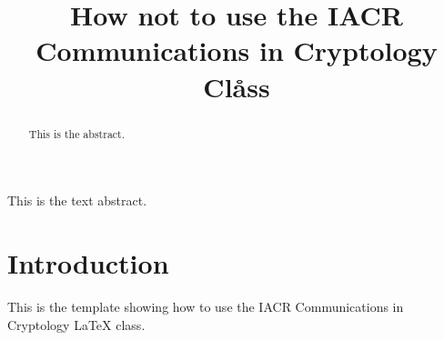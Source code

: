 \documentclass[version=final]{iacrcc}
\title[running  = {The iacrcc class},
       subtitle = {A Template}
      ]{How not to use the IACR Communications in Cryptology Cl\r{a}ss}
\begin{document}
\maketitle

\begin{abstract}
This is the abstract.
\end{abstract}
\begin{textabstract}
This is the text abstract.
\end{textabstract}

\section{Introduction}
This is the template showing how to use the IACR Communications in Cryptology \LaTeX{} class. 
\lipsum[1-5]
\end{document}
